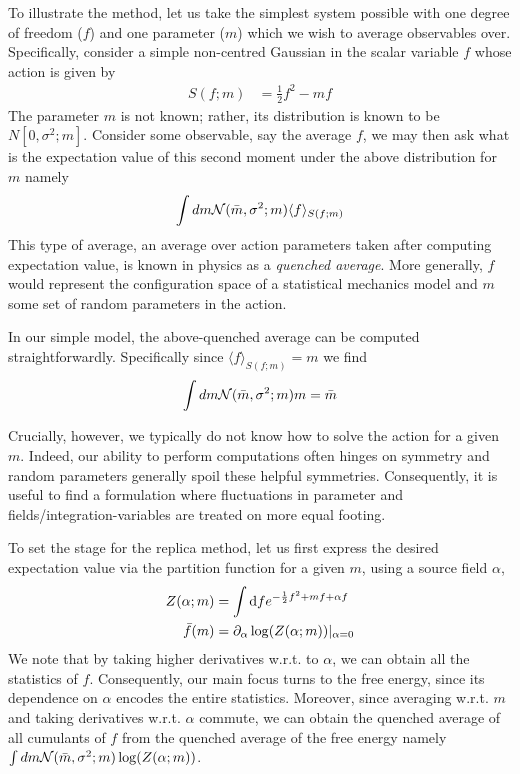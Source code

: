 To illustrate the method, let us take the simplest system possible with one degree of freedom ($f$) and one parameter ($m$) which we wish to average observables over. Specifically, consider a simple non-centred Gaussian in the scalar variable $f$ whose action is given by 
\begin{align}
S(f;m) &= \frac{1}{2} f^2 - m f
\end{align}
The parameter $m$ is not known; rather, its distribution is known to be $N[0,\sigma^2;m]$. Consider some observable, say the average $f$, we may then ask what is the expectation value of this second moment under the above distribution for $m$ namely 
\begin{align}
\int dm {\cal N}(\bar{m},\sigma^2;m) \langle f \rangle_{S(f;m)}
\end{align}
This type of average, an average over action parameters taken after computing expectation value, is known in physics as a {\it quenched average}. More generally, $f$ would represent the configuration space of a statistical mechanics model and $m$ some set of random parameters in the action.  

In our simple model, the above-quenched average can be computed straightforwardly. Specifically since $\langle f \rangle_{S(f;m)}=m$ we find 
\begin{align}
\int dm {\cal N}(\bar{m},\sigma^2;m) m = \bar{m}
\end{align}

Crucially, however, we typically do not know how to solve the action for a given $m$. Indeed, our ability to perform computations often hinges on symmetry and random parameters generally spoil these helpful symmetries. Consequently, it is useful to find a formulation where fluctuations in parameter and fields/integration-variables are treated on more equal footing.  

To set the stage for the replica method, let us first express the desired expectation value via the partition function for a given $m$, using a source field $\alpha$,
\begin{align}
Z(\alpha;m) &= \int \text{d} f e^{-\frac{1}{2}f^2 + mf + \alpha f} \\ \nonumber 
\bar{f}(m) &= \partial_{\alpha}\log(Z(\alpha;m))|_{\alpha=0}
\end{align}
We note that by taking higher derivatives w.r.t. to $\alpha$, we can obtain all the statistics of $f$. Consequently, our main focus turns to the free energy, since its dependence on $\alpha$ encodes the entire statistics. Moreover, since averaging w.r.t. $m$ and taking derivatives w.r.t. $\alpha$ commute, we can obtain the quenched average of all cumulants of $f$ from the quenched average of the free energy namely $\int dm {\cal N}(\bar{m},\sigma^2;m) \log(Z(\alpha;m))$. 

